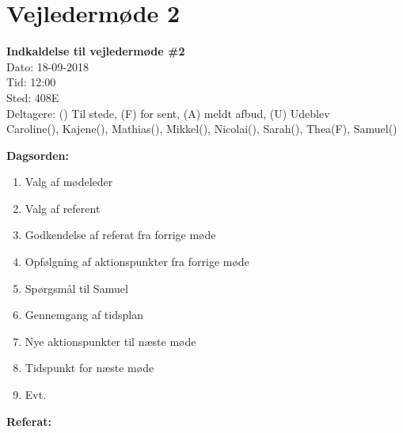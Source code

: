 \section{Vejledermøde 2}

\vspace{0.5 cm}
\textbf{Indkaldelse til vejledermøde \#2} \\

Dato: 18-09-2018 \\
Tid: 12:00 \\
Sted: 408E \\
Deltagere: () Til stede, (F) for sent, (A) meldt afbud, (U) Udeblev \\
Caroline(), Kajene(), Mathias(), Mikkel(), Nicolai(), Sarah(), Thea(F), Samuel() 

\vspace{0.1 cm}
\textbf{Dagsorden:}

\begin{enumerate}
	\item Valg af mødeleder
	\item Valg af referent
	\item Godkendelse af referat fra forrige møde
	\item Opfølgning af aktionspunkter fra forrige møde
	\item Spørgsmål til Samuel
	\item Gennemgang af tidsplan
	\item Nye aktionspunkter til næste møde
	\item Tidspunkt for næste møde
	\item Evt.
\end{enumerate}

\textbf{Referat:}

